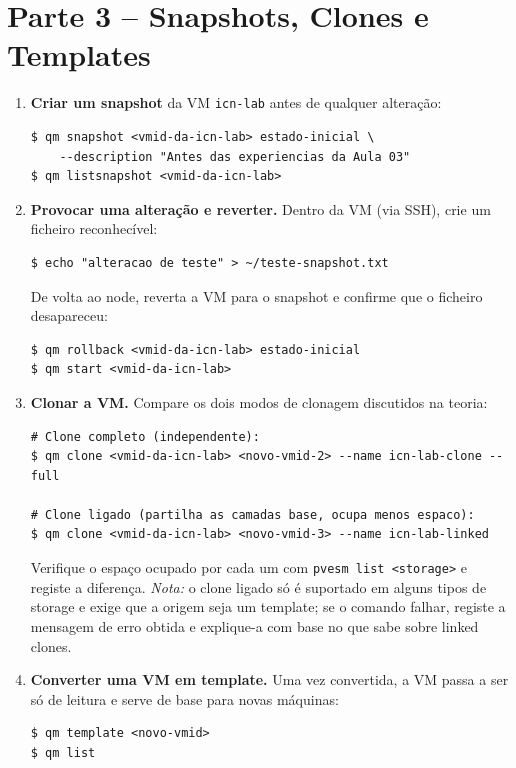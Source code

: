 \documentclass[11pt,a4paper]{article}
\begin{document}
\section{Parte 3 -- Snapshots, Clones e Templates}
\begin{enumerate}[label=\arabic*.,resume]

  \item \textbf{Criar um snapshot} da VM \texttt{icn-lab} antes de qualquer alteração:
\begin{lstlisting}
$ qm snapshot <vmid-da-icn-lab> estado-inicial \
    --description "Antes das experiencias da Aula 03"
$ qm listsnapshot <vmid-da-icn-lab>
\end{lstlisting}

  \item \textbf{Provocar uma alteração e reverter.} Dentro da VM (via SSH), crie um ficheiro reconhecível:
\begin{lstlisting}
$ echo "alteracao de teste" > ~/teste-snapshot.txt
\end{lstlisting}
  De volta ao node, reverta a VM para o snapshot e confirme que o ficheiro desapareceu:
\begin{lstlisting}
$ qm rollback <vmid-da-icn-lab> estado-inicial
$ qm start <vmid-da-icn-lab>
\end{lstlisting}

  \item \textbf{Clonar a VM.} Compare os dois modos de clonagem discutidos na teoria:
\begin{lstlisting}
# Clone completo (independente):
$ qm clone <vmid-da-icn-lab> <novo-vmid-2> --name icn-lab-clone --full

# Clone ligado (partilha as camadas base, ocupa menos espaco):
$ qm clone <vmid-da-icn-lab> <novo-vmid-3> --name icn-lab-linked
\end{lstlisting}
  Verifique o espaço ocupado por cada um com \texttt{pvesm list <storage>} e registe a diferença.
  \emph{Nota:} o clone ligado só é suportado em alguns tipos de storage e exige que a origem seja um template; se o comando falhar, registe a mensagem de erro obtida e explique-a com base no que sabe sobre linked clones.

  \item \textbf{Converter uma VM em template.} Uma vez convertida, a VM passa a ser só de leitura e serve de base para novas máquinas:
\begin{lstlisting}
$ qm template <novo-vmid>
$ qm list
\end{lstlisting}

\end{enumerate}
\end{document}
